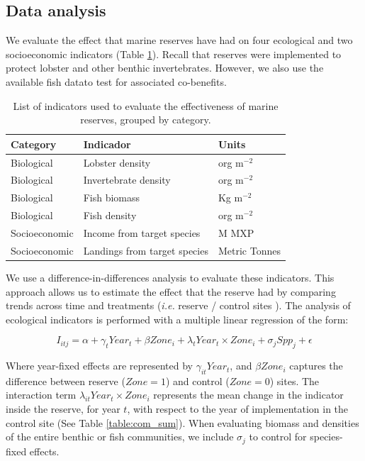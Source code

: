 \documentclass{frontiersSCNS}
\begin{document}
\subsection{Data analysis}\label{data-analysis}

We evaluate the effect that marine reserves have had on four ecological
and two socioeconomic indicators (Table \ref{table:indicators}). Recall
that reserves were implemented to protect lobster and other benthic
invertebrates. However, we also use the available fish datato test for
associated co-benefits.

\begin{table}[H]

\caption{\label{tab:unnamed-chunk-3}\label{table:indicators}List of indicators used to evaluate the effectiveness of marine reserves, grouped by category.}
\centering
\begin{tabular}[t]{l|l|l}
\hline
Category & Indicador & Units\\
\hline
Biological & Lobster density & org $\mathrm{m}^{-2}$\\
\hline
Biological & Invertebrate density & org $\mathrm{m}^{-2}$\\
\hline
Biological & Fish biomass & Kg $\mathrm{m}^{-2}$\\
\hline
Biological & Fish density & org $\mathrm{m}^{-2}$\\
\hline
Socioeconomic & Income from target species & M MXP\\
\hline
Socioeconomic & Landings from target species & Metric Tonnes\\
\hline
\end{tabular}
\end{table}

We use a difference-in-differences analysis to evaluate these
indicators. This approach allows us to estimate the effect that the
reserve had by comparing trends across time and treatments (\emph{i.e.}
reserve / control sites \citet{moland_2013-VP,Villasenor-Derbez_2018}).
The analysis of ecological indicators is performed with a multiple
linear regression of the form:

\begin{equation}
I_{itj} = \alpha + \gamma_{t} Year_t + \beta Zone_i + \lambda_{t} Year_t\times Zone_i + \sigma_jSpp_j + \epsilon
\label{eqn:reg_bio}
\end{equation}

Where year-fixed effects are represented by \(\gamma_{it} Year_t\), and
\(\beta Zone_i\) captures the difference between reserve (\(Zone = 1\))
and control (\(Zone = 0\)) sites. The interaction term
\(\lambda_{it} Year_t\times Zone_i\) represents the mean change in the
indicator inside the reserve, for year \(t\), with respect to the year
of implementation in the control site (See Table \ref{table:com_sum}).
When evaluating biomass and densities of the entire benthic or fish
communities, we include \(\sigma_j\) to control for species-fixed
effects.
\end{document}
